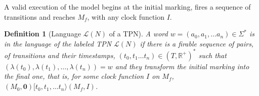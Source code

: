 \documentclass[conference]{IEEEtran}
\newtheorem{definition}{Definition}
\begin{document}
A valid execution of the model begins at the initial marking, fires a sequence of transitions %
and reaches $M_f$, with any clock function $I$. 

\begin{definition}[Language $\mathcal{L}(N)$ of a TPN]
	A word $w = (a_0, a_1, \dots a_n) \in \Sigma^*$ is in the language of the labeled TPN $\mathcal{L}(N)$ if there is a firable sequence of pairs, of transitions and their timestamps, $(t_0, t_1 \dots t_n) \in (T, \mathbb{R^+})^*$ such that $(\lambda(t_0),\lambda( t_1), \dots,\lambda (t_n)) = w $ and they transform the initial marking into the final one, that is, for some clock function $I$ on $M_f$, $(M_0, \mathbf{0}) [t_0, t_1, \dots t_n\rangle (M_f, I)$. 
\end{definition}
\end{document}
